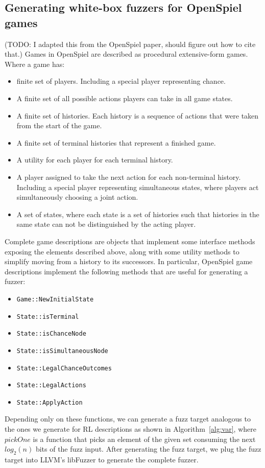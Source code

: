 \subsection{Generating white-box fuzzers for OpenSpiel games} \label{osWhiteBox}
(TODO: I adapted this from the OpenSpiel paper, should figure out how to cite that.)
Games in OpenSpiel are described as procedural extensive-form games. Where a game has:
\begin{itemize}
    \item finite set of players. Including a special player representing chance.
    \item A finite set of all possible actions players can take in all game states.
    \item A finite set of histories. Each history is a sequence of actions that were taken from the start
    of the game.
    \item A finite set of terminal histories that represent a finished game.
    \item A utility for each player for each terminal history.
    \item A player assigned to take the next action for each non-terminal history. Including a special player representing simultaneous states, 
        where players act simultaneously choosing a joint action.
    \item A set of states, where each state is a set of histories such that histories in the same state can not be distinguished by the acting player.
\end{itemize}

Complete game descriptions are objects that implement some interface methods exposing the elements 
described above, along with some utility methods to simplify moving from a history to its successors.
In particular, OpenSpiel game descriptions implement the following methods that are useful for generating a fuzzer:
\begin{itemize}
    \item \texttt{Game::NewInitialState}
    \item \texttt{State::isTerminal}
    \item \texttt{State::isChanceNode}
    \item \texttt{State::isSimultaneousNode}
    \item \texttt{State::LegalChanceOutcomes}
    \item \texttt{State::LegalActions}
    \item \texttt{State::ApplyAction}
\end{itemize}
Depending only on these functions, we can generate a fuzz target analogous to the ones we generate for RL descriptions 
as shown in Algorithm~\ref{alg:var}, where $pickOne$ is a function that picks an element of the given set consuming the next $log_2(n)$ bits of 
the fuzz input. After generating the fuzz target, we plug the fuzz target into LLVM's libFuzzer
to generate the complete fuzzer.

